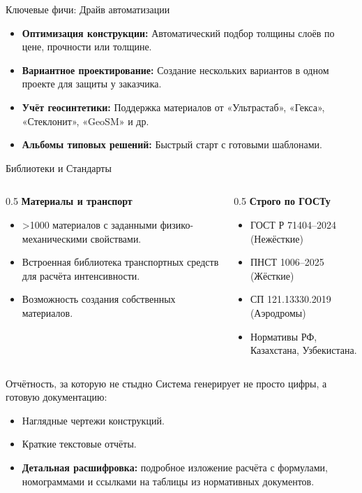 \documentclass[aspectratio=169]{beamer}
\begin{document}
\begin{frame}{Ключевые фичи: Драйв автоматизации}
    \begin{itemize}
        \item \alert{\textbf{Оптимизация конструкции:}} Автоматический подбор толщины слоёв по цене, прочности или толщине.
        \item \alert{\textbf{Вариантное проектирование:}} Создание нескольких вариантов в одном проекте для защиты у заказчика.
        \item \alert{\textbf{Учёт геосинтетики:}} Поддержка материалов от «Ультрастаб», «Гекса», «Стеклонит», «GeoSM» и др.
        \item \alert{\textbf{Альбомы типовых решений:}} Быстрый старт с готовыми шаблонами.
    \end{itemize}
\end{frame}

\begin{frame}{Библиотеки и Стандарты}
    \begin{columns}
        \begin{column}{0.5\textwidth}
            \textbf{Материалы и транспорт}
            \begin{itemize}
                \item \alert{>1000} материалов с заданными физико-механическими свойствами.
                \item Встроенная библиотека транспортных средств для расчёта интенсивности.
                \item Возможность создания собственных материалов.
            \end{itemize}
        \end{column}
        \begin{column}{0.5\textwidth}
            \textbf{Строго по ГОСТу}
            \begin{itemize}
                \item ГОСТ Р 71404–2024 (Нежёсткие)
                \item ПНСТ 1006–2025 (Жёсткие)
                \item СП 121.13330.2019 (Аэродромы)
                \item Нормативы РФ, Казахстана, Узбекистана.
            \end{itemize}
        \end{column}
    \end{columns}
\end{frame}

\begin{frame}{Отчётность, за которую не стыдно}
    Система генерирует не просто цифры, а \alert{готовую документацию}:
    \vspace{0.5cm}
    \begin{itemize}
        \item Наглядные чертежи конструкций.
        \item Краткие текстовые отчёты.
        \item \textbf{Детальная расшифровка:} подробное изложение расчёта с формулами, номограммами и ссылками на таблицы из нормативных документов.
    \end{itemize}
\end{frame}
\end{document}
